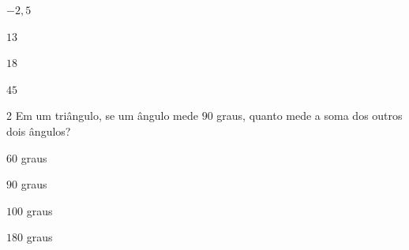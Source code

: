 \begin{escolha}
\item $-2,5$
\item $13$
\item $18$
\item $45$
\end{escolha}



\num{2}  Em um triângulo, se um ângulo mede $90$ graus, quanto mede a soma dos
outros dois ângulos?

\begin{escolha}
\item $60$ graus
\item $90$ graus
\item $100$ graus
\item $180$ graus
\end{escolha}



